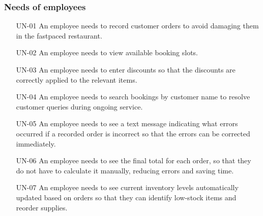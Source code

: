 \documentclass[]{VUMIFTemplateClass}
\newcommand{\noticecomment}[1]{%
    \begin{tcolorbox}[colback=blue!20, colframe=blue!60, arc=0pt, outer arc=0pt, boxrule=1pt, left=3pt, right=3pt, top=3pt, bottom=3pt]
        \textbf{\textcolor{blue!70!black}{NOTE:}} #1
    \end{tcolorbox}
}
\newcommand{\todocomment}[1]{%
    \begin{tcolorbox}[colback=red!20, colframe=red!60, arc=0pt, outer arc=0pt, boxrule=1pt, left=3pt, right=3pt, top=3pt, bottom=3pt]
        \textbf{\textcolor{orange!70!black}{TODO:}} #1
    \end{tcolorbox}
}
\begin{document}




\subsubsection{Needs of employees}
\begin{itemize}
    \item[UN-01]\label{UN-01} An employee needs to record customer orders to avoid damaging them in the fastpaced restaurant.
   
    \item[UN-02]\label{UN-02} An employee needs to view available booking slots.

    \item[UN-03]\label{UN-03} An employee needs to enter discounts so that the discounts are correctly applied to the relevant items.

    
    \item[UN-04]\label{UN-04} An employee needs to search bookings by customer name to resolve customer queries during ongoing service.
    \item[UN-05]\label{UN-05} An employee needs to see a text message indicating what errors occurred if a recorded order is incorrect so that the errors can be corrected immediately.
    \item[UN-06]\label{UN-06} An employee needs to see the final total for each order, so that they do not have to calculate it manually, reducing errors and saving time.
    \item[UN-07]\label{UN-07} An employee needs to see current inventory levels automatically updated based on orders so that they can identify low-stock items and reorder supplies.

\end{itemize}
\end{document}
